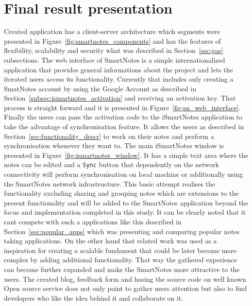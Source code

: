 \section{Final result presentation}\label{sec:result}
Created application has a client-server architecture which segments were presented in Figure~\ref{fig:smartnotes_components} and has the features of flexibility, scalability and security what was described in Section~\ref{sec:gae} subsections. The web interface of SmartNotes is a simple internationalized application that provides general informations about the project and lets the iterated users access its functionality. Currently that includes only creating a SmatNotes account by using the Google Account as described in Section~\ref{subsec:ismartnotes_activation} and receiving an activation key. That process is straight forward and it is presented in Figure~\ref{fig:sn_web_interface}. Finally the users can pass the activation code to  the iSmartNotes application to take the advantage of synchronisation feature. It allows the users as described in Section~\ref{sec:functionality_descr} to work on their notes and perform a synchronisation whenever they want to. The main iSmartNotes window is presented in Figure~\ref{fig:ismartnotes_window}. It has a simple text area where the notes can be edited and a \texttt{Sync} button that dependently on the network connectivity will perform synchronisation on local machine or additionally using the SmartNotes network infrastructure. This basic attempt realises the functionality  excluding sharing and grouping notes which are extensions to the present functionality and will be added to the SmartNotes application beyond the focus and implementation completed in this study. It can be clearly noted that it cant compete with such a applications like this described in Section~\ref{sec:popular_apps} which was presenting and comparing popular notes taking applications. On the other hand that related work was used as a inspiration for  creating a scalable fundament that could be later become more complex by adding additional functionality. That way the gathered experience can become further expanded and make the SmartNotes more attractive to the users. The created blog, feedback form and hosing the source code on well known Open source service does not only point to gather users attention but also to find developers who like the idea behind it and collaborate on it. 

